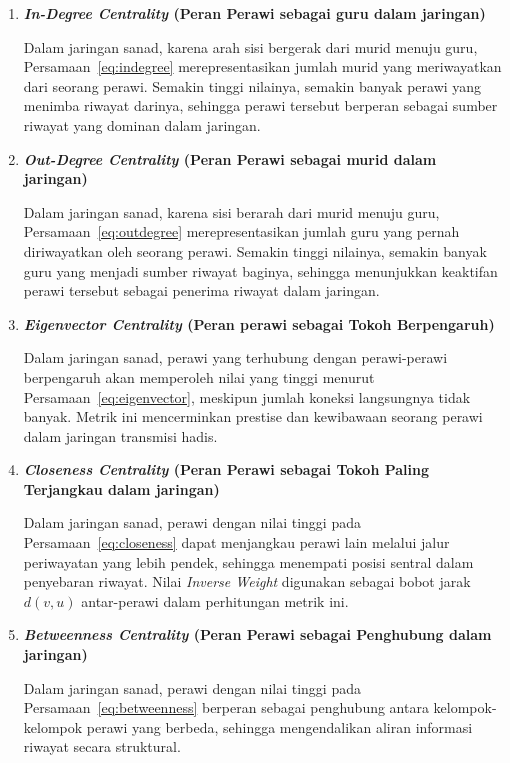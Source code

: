 \begin{enumerate}
	\item \textbf{\textit{In-Degree Centrality} (Peran Perawi sebagai guru dalam jaringan)}

	Dalam jaringan sanad, karena arah sisi bergerak dari murid menuju guru, Persamaan~\eqref{eq:indegree} merepresentasikan jumlah murid yang meriwayatkan dari seorang perawi. Semakin tinggi nilainya, semakin banyak perawi yang menimba riwayat darinya, sehingga perawi tersebut berperan sebagai sumber riwayat yang dominan dalam jaringan.

	\item \textbf{\textit{Out-Degree Centrality} (Peran Perawi sebagai murid dalam jaringan)}

	Dalam jaringan sanad, karena sisi berarah dari murid menuju guru, Persamaan~\eqref{eq:outdegree} merepresentasikan jumlah guru yang pernah diriwayatkan oleh seorang perawi. Semakin tinggi nilainya, semakin banyak guru yang menjadi sumber riwayat baginya, sehingga menunjukkan keaktifan perawi tersebut sebagai penerima riwayat dalam jaringan.

	\item \textbf{\textit{Eigenvector Centrality} (Peran perawi sebagai Tokoh Berpengaruh)}

	Dalam jaringan sanad, perawi yang terhubung dengan perawi-perawi berpengaruh akan memperoleh nilai yang tinggi menurut Persamaan~\eqref{eq:eigenvector}, meskipun jumlah koneksi langsungnya tidak banyak. Metrik ini mencerminkan prestise dan kewibawaan seorang perawi dalam jaringan transmisi hadis.

	\item \textbf{\textit{Closeness Centrality} (Peran Perawi sebagai Tokoh Paling Terjangkau dalam jaringan)}

	Dalam jaringan sanad, perawi dengan nilai tinggi pada Persamaan~\eqref{eq:closeness} dapat menjangkau perawi lain melalui jalur periwayatan yang lebih pendek, sehingga menempati posisi sentral dalam penyebaran riwayat. Nilai \textit{Inverse Weight} digunakan sebagai bobot jarak $d(v,u)$ antar-perawi dalam perhitungan metrik ini.

	\item \textbf{\textit{Betweenness Centrality} (Peran Perawi sebagai Penghubung dalam jaringan)}

	Dalam jaringan sanad, perawi dengan nilai tinggi pada Persamaan~\eqref{eq:betweenness} berperan sebagai penghubung antara kelompok-kelompok perawi yang berbeda, sehingga mengendalikan aliran informasi riwayat secara struktural.

\end{enumerate}

